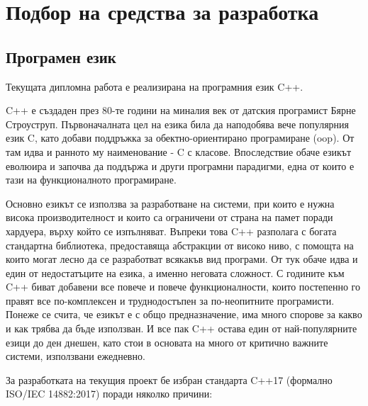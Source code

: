 \section{Подбор на средства за разработка}

\subsection{Програмен език}

Текущата дипломна работа е реализирана на програмния език C++.

C++ е създаден през 80-те години на миналия век от датския програмист Бярне
Строуструп. Първоначалната цел на езика била да наподобява вече популярния език
C, като добави поддръжка за обектно-ориентирано програмиране (\acrshort{oop}).
От там идва и ранното му наименование - C с класове. Впоследствие обаче езикът
еволюира и започва да поддържа и други програмни парадигми, една от които е тази
на функционалното програмиране.



Основно езикът се използва за разработване на системи, при които е нужна висока
производителност и които са ограничени от страна на памет поради хардуера,
върху който се изпълняват. Въпреки това C++ разполага с богата стандартна
библиотека, предоставяща абстракции от високо ниво, с помощта на които могат
лесно да се разработват всякакъв вид програми. От тук обаче идва и един от
недостатъците на езика, а именно неговата сложност. С годините към C++ биват
добавени все повече и повече функционалности, които постепенно го правят все
по-комплексен и труднодостъпен за по-неопитните програмисти. Понеже се счита, че
езикът е с общо предназначение, има много спорове за какво и как трябва да бъде
използван. И все пак C++ остава един от най-популярните езици до ден днешен,
като стои в основата на много от критично важните системи, използвани ежедневно.

За разработката на текущия проект бе избран стандарта C++17 (формално
ISO/IEC 14882:2017) поради няколко причини:

